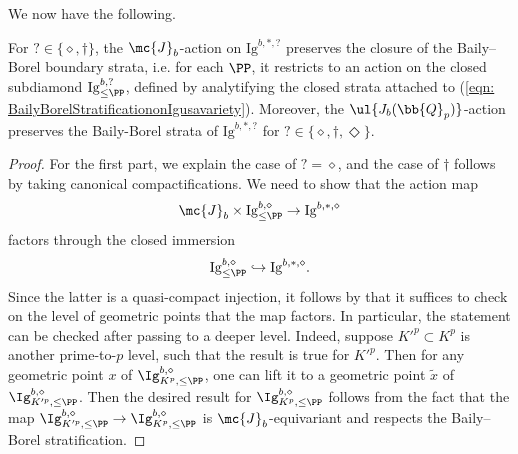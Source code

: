 \documentclass[letterpaper,11pt]{amsart}
\begin{document}
We now have the following.
\begin{proposition}\label{prop: JbPreserveBoundary}
    For $? \in \{\diamond,\dagger\}$, the $\mc{J}_b$-action on $\mathrm{Ig}^{b,\ast,?}$ preserves the closure of the Baily--Borel boundary strata, i.e. for each $\PP$, it restricts to an action on the closed subdiamond $\mathrm{Ig}^{b,?}_{\leq\PP}$, defined by analytifying the closed strata attached to (\ref{eqn: BailyBorelStratificationonIgusavariety}). Moreover, the $\ul{J_{b}(\bb{Q}_{p})}$-action preserves the Baily-Borel strata of $\mathrm{Ig}^{b,\ast,?}$ for $? \in \{\diamond,\dagger,\Diamond\}$.
\end{proposition}
\begin{proof}
For the first part, we explain the case of $? = \diamond$, and the case of $\dagger$ follows by taking canonical compactifications. We need to show that the action map 
    \[\mc{J}_b\times \mathrm{Ig}^{b,\diamond}_{\leq\PP}\to \mathrm{Ig}^{b,\ast,\diamond} \]
    factors through the closed immersion 
    \[ \mathrm{Ig}^{b,\diamond}_{\leq\PP} \hookrightarrow \mathrm{Ig}^{b,\ast,\diamond}. \]
    Since the latter is a quasi-compact injection, it follows by \cite[Proposition 11.20]{Ecod} that it suffices to check on the level of geometric points that the map factors. In particular, the statement can be checked after passing to a deeper level. Indeed, suppose $K'^{p}\subset K^p$ is another prime-to-$p$ level, such that the result is true for $K'^{p}$. Then for any geometric point $x$ of $ \Ig^{b,\diamond}_{K^p,\leq \PP}$, one can lift it to a geometric point $\tilde{x}$ of $ \Ig^{b,\diamond}_{K'^p,\leq \PP}$. Then the desired result for $\Ig^{b,\diamond}_{K^p,\leq \PP}$ follows from the fact that the map $\Ig^{b,\diamond}_{K'^p,\leq \PP}\to \Ig^{b,\diamond}_{K^p,\leq \PP}$ is $\mc{J}_b$-equivariant and respects the Baily--Borel stratification.
    

\end{proof}
\end{document}
